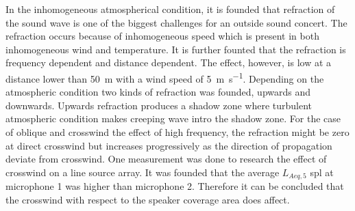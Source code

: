 In the inhomogeneous atmospherical condition, it is founded that refraction of the sound wave is one of the biggest challenges for an outside sound concert. The refraction occurs because of inhomogeneous speed which is present in both inhomogeneous wind and temperature. It is further founted that the refraction is frequency dependent and distance dependent. The effect, however, is low at a distance lower than \SI{50}{\meter} with a wind speed of \SI{5}{\meter\per\second}. Depending on the atmospheric condition two kinds of refraction was founded, upwards and downwards. Upwards refraction produces a shadow zone where turbulent atmospheric condition makes creeping wave intro the shadow zone. For the case of oblique and crosswind the effect of high frequency, the refraction might be zero at direct crosswind but increases progressively as the direction of propagation deviate from crosswind. One measurement was done to research the effect of crosswind on a line source array. It was founded that the average $L_{Aeq,5}$ \gls{spl} at microphone 1 was  higher than microphone 2. Therefore it can be concluded that the crosswind with respect to the speaker coverage area does affect. 
 

  

